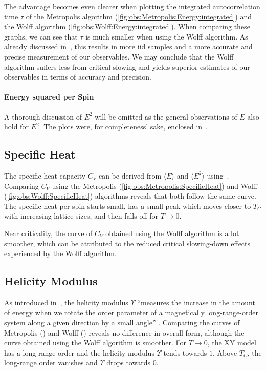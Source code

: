 		The advantage becomes even clearer when plotting the integrated autocorrelation time $\tau$ of the Metropolis algorithm (\cref{fig:obs:Metropolis:Energy:integrated}) and the Wolff algorithm (\cref{fig:obs:Wolff:Energy:integrated}). When comparing these graphs, we can see that $\tau$ is much smaller when using the Wolff algorithm. As already discussed in~, this results in more iid samples and a more accurate and precise measurement of our observables. We may conclude that the Wolff algorithm suffers less from critical slowing and yields superior estimates of our observables in terms of accuracy and precision.
	
	\paragraph{Energy squared per Spin} A thorough discussion of $E^2$ will be omitted as the general observations of $E$ also hold for $E^2$. The plots were, for completeness' sake, enclosed in~.
	
	\subsection{Specific Heat}
		The specific heat capacity $C_V$ can be derived from $\langle E \rangle$ and $\langle E^2 \rangle$  using~. Comparing $C_V$ using the Metropolis (\cref{fig:obs:Metropolis:SpecificHeat}) and Wolff (\cref{fig:obs:Wolff:SpecificHeat}) algorithms reveals that both follow the same curve. The specific heat per spin starts small, has a small peak which moves closer to $T_C$ with increasing lattice sizes, and then falls off for $T\rightarrow 0$.
		
		Near criticality, the curve of $C_V$ obtained using the Wolff algorithm is a lot smoother, which can be attributed to the reduced critical slowing-down effects experienced by the Wolff algorithm.
	
	\subsection{Helicity Modulus}
		As introduced in~, the helicity modulus $\Upsilon$ \enquote{measures the increase in the amount of energy when we rotate the order parameter of a magnetically long-range-order system along a given direction by a small angle} \cite{krueger}. Comparing the curves of Metropolis () and Wolff () reveals no difference in overall form, although the curve obtained using the Wolff algorithm is smoother. For $T \rightarrow 0$, the XY model has a long-range order and the helicity modulus $\Upsilon$ tends towards $1$. Above $T_C$, the long-range order vanishes and $\Upsilon$ drops towards $0$.

	